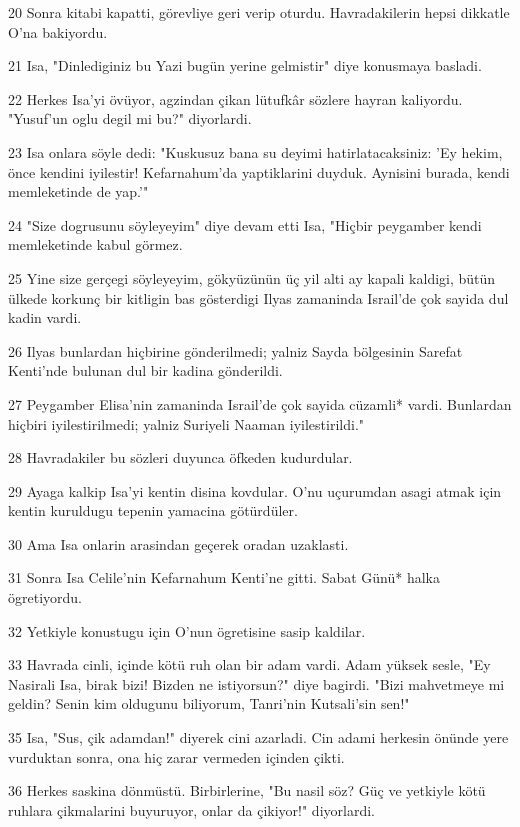 \par 20 Sonra kitabi kapatti, görevliye geri verip oturdu. Havradakilerin hepsi dikkatle O'na bakiyordu.
\par 21 Isa, "Dinlediginiz bu Yazi bugün yerine gelmistir" diye konusmaya basladi.
\par 22 Herkes Isa'yi övüyor, agzindan çikan lütufkâr sözlere hayran kaliyordu. "Yusuf'un oglu degil mi bu?" diyorlardi.
\par 23 Isa onlara söyle dedi: "Kuskusuz bana su deyimi hatirlatacaksiniz: 'Ey hekim, önce kendini iyilestir! Kefarnahum'da yaptiklarini duyduk. Aynisini burada, kendi memleketinde de yap.'"
\par 24 "Size dogrusunu söyleyeyim" diye devam etti Isa, "Hiçbir peygamber kendi memleketinde kabul görmez.
\par 25 Yine size gerçegi söyleyeyim, gökyüzünün üç yil alti ay kapali kaldigi, bütün ülkede korkunç bir kitligin bas gösterdigi Ilyas zamaninda Israil'de çok sayida dul kadin vardi.
\par 26 Ilyas bunlardan hiçbirine gönderilmedi; yalniz Sayda bölgesinin Sarefat Kenti'nde bulunan dul bir kadina gönderildi.
\par 27 Peygamber Elisa'nin zamaninda Israil'de çok sayida cüzamli* vardi. Bunlardan hiçbiri iyilestirilmedi; yalniz Suriyeli Naaman iyilestirildi."
\par 28 Havradakiler bu sözleri duyunca öfkeden kudurdular.
\par 29 Ayaga kalkip Isa'yi kentin disina kovdular. O'nu uçurumdan asagi atmak için kentin kuruldugu tepenin yamacina götürdüler.
\par 30 Ama Isa onlarin arasindan geçerek oradan uzaklasti.
\par 31 Sonra Isa Celile'nin Kefarnahum Kenti'ne gitti. Sabat Günü* halka ögretiyordu.
\par 32 Yetkiyle konustugu için O'nun ögretisine sasip kaldilar.
\par 33 Havrada cinli, içinde kötü ruh olan bir adam vardi. Adam yüksek sesle, "Ey Nasirali Isa, birak bizi! Bizden ne istiyorsun?" diye bagirdi. "Bizi mahvetmeye mi geldin? Senin kim oldugunu biliyorum, Tanri'nin Kutsali'sin sen!"
\par 35 Isa, "Sus, çik adamdan!" diyerek cini azarladi. Cin adami herkesin önünde yere vurduktan sonra, ona hiç zarar vermeden içinden çikti.
\par 36 Herkes saskina dönmüstü. Birbirlerine, "Bu nasil söz? Güç ve yetkiyle kötü ruhlara çikmalarini buyuruyor, onlar da çikiyor!" diyorlardi.
